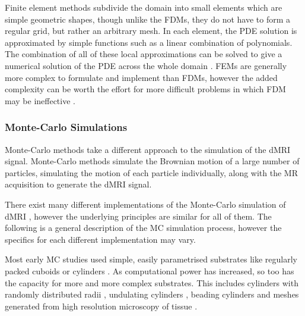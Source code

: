 Finite element methods subdivide the domain into small elements which are simple geometric shapes, though unlike the \acp{FDM}, they do not have to form a regular grid, but rather an arbitrary mesh.
In each element, the \ac{PDE} solution is approximated by simple functions such as a linear combination of polynomials.
The combination of all of these local approximations can be solved to give a numerical solution of the \ac{PDE} across the whole domain \cite{Logan2007}.
\acp{FEM} are generally more complex to formulate and implement than \acp{FDM}, however the added complexity can be worth the effort for more difficult problems in which \ac{FDM} may be ineffective \cite{Iserles2009}.

\subsubsection{Monte-Carlo Simulations}
\label{sec:montecarlo}
Monte-Carlo methods take a different approach to the simulation of the \ac{dMRI} signal. Monte-Carlo methods simulate the Brownian motion of a large number of particles, simulating the motion of each particle individually, along with the MR acquisition to generate the \ac{dMRI} signal.

There exist many different implementations of the Monte-Carlo simulation of \ac{dMRI} \cite{Yeh2013,Nilsson2012,Landman2010,Balls2009,Hall2009,Ford1997,Szafer1995}, however the underlying principles are similar for all of them. The following is a general description of the \ac{MC} simulation process, however the specifics for each different implementation may vary. 



Most early \ac{MC} studies used simple, easily parametrised substrates like regularly packed cuboids \cite{Szafer1995} or cylinders \cite{Ford1997}.
As computational power has increased, so too has the capacity for more and more complex substrates.
This includes cylinders with randomly distributed radii \cite{Hall2009}, undulating  cylinders \cite{Nilsson2012}, beading cylinders \cite{Budde2010} and meshes generated from high resolution microscopy of tissue \cite{Panagiotaki2010}.

